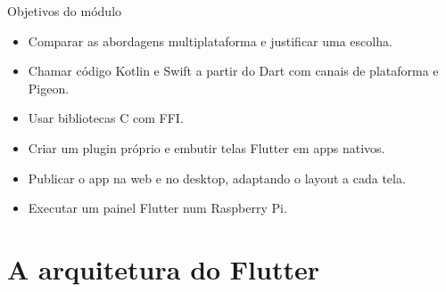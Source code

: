 \documentclass[aspectratio=169,10pt]{beamer}
\begin{document}
\capa

\begin{frame}{Objetivos do módulo}
  \begin{conceito}
    \begin{itemize}
      \item Comparar as abordagens multiplataforma e justificar uma escolha.
      \item Chamar código Kotlin e Swift a partir do Dart com canais de plataforma e Pigeon.
      \item Usar bibliotecas C com FFI.
      \item Criar um plugin próprio e embutir telas Flutter em apps nativos.
      \item Publicar o app na web e no desktop, adaptando o layout a cada tela.
      \item Executar um painel Flutter num Raspberry Pi.
    \end{itemize}
  \end{conceito}
\end{frame}

\sumario



\section{A arquitetura do Flutter}
\end{document}
